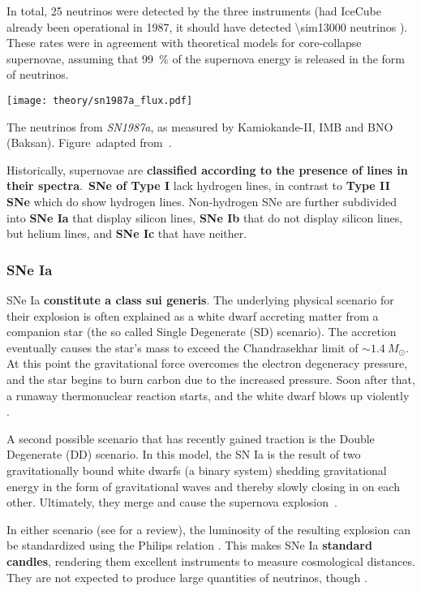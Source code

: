 In total, 25 neutrinos were detected by the three instruments (had IceCube already been operational in 1987, it should have detected \num{\sim13000} neutrinos ). These rates were in agreement with theoretical models for core-collapse supernovae, assuming that \SI{99}{\percent} of the supernova energy is released in the form of neutrinos.

\begin{marginfigure}
    \texttt{[image: theory/sn1987a\_flux.pdf]}
    \caption[Neutrinos from \emph{SN1987a}]{The neutrinos from \emph{SN1987a}, as measured by Kamiokande-II, IMB and BNO (Baksan). Figure\ adapted from~\cite{Grupen2005}.}
\end{marginfigure}

Historically, supernovae are \textbf{classified according to the presence of lines in their spectra}.\ \textbf{SNe of Type I} lack hydrogen lines, in contrast to \textbf{Type II SNe} which do show hydrogen lines. Non-hydrogen SNe are further subdivided into \textbf{SNe Ia} that display silicon lines, \textbf{SNe Ib} that do not display silicon lines, but helium lines, and \textbf{SNe Ic} that have neither.

\subsubsection{SNe Ia}\label{sne_ia}
SNe Ia \textbf{constitute a class sui generis}. The underlying physical scenario for their explosion is often explained as a white dwarf accreting matter from a companion star (the so called Single Degenerate (SD) scenario). The accretion eventually causes the star's mass to exceed the Chandrasekhar limit of $\sim1.4~M_\odot$. At this point the gravitational force overcomes the electron degeneracy pressure, and the star begins to burn carbon due to the increased pressure. Soon after that, a runaway thermonuclear reaction starts, and the white dwarf blows up violently .

A second possible scenario that has recently gained traction is the Double Degenerate (DD) scenario. In this model, the SN Ia is the result of two gravitationally bound white dwarfs (a binary system) shedding gravitational energy in the form of gravitational waves and thereby slowly closing in on each other. Ultimately, they merge and cause the supernova explosion~\cite{Iben1984}.

In either scenario (see  for a review), the luminosity of the resulting explosion can be standardized using the Philips relation . This makes SNe Ia \textbf{standard candles}, rendering them excellent instruments to measure cosmological distances. They are not expected to produce large quantities of neutrinos, though .

